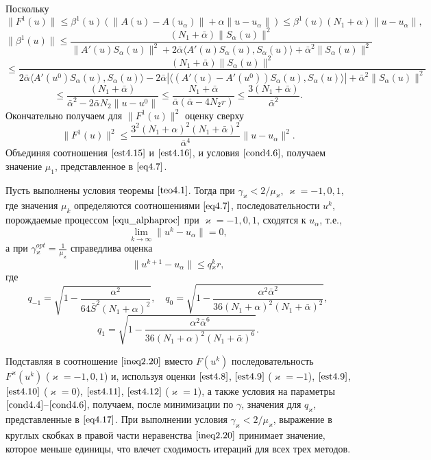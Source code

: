 Поскольку
$$\|F^1(u)\|\le\beta^1(u)(\|A(u)-A(u_\alpha)\|+\alpha\|u-u_\alpha\|)\le \beta^1(u)(N_1+\alpha)\|u-u_\alpha\|,$$ $$\|\beta^1(u)\|\le\frac{(N_1+\bar\alpha)\|S_\alpha(u)\|^2}{\|A'(u)S_\alpha(u)\|^2+2\bar\alpha\langle A'(u)S_\alpha(u), S_\alpha(u)\rangle+\bar\alpha^2\|S_\alpha(u)\|^2}$$ $$\le\frac{(N_1+\bar\alpha)\|S_\alpha(u)\|^2}{2\bar\alpha\langle A'(u^0)S_\alpha(u), S_\alpha(u)\rangle-2\bar\alpha|\langle (A'(u)-A'(u^0))S_\alpha(u), S_\alpha(u)\rangle|+\bar\alpha^2\|S_\alpha(u)\|^2}$$$$
\le\frac{(N_1+\bar\alpha)}{\bar\alpha^2-2\bar\alpha N_2\|u-u^0\|}\le\frac{N_1+\bar\alpha}{\bar\alpha(\bar\alpha - 4N_2 r)}\le\frac{3(N_1+\bar\alpha)}{\bar\alpha^2}.$$
Окончательно получаем для $\|F^1(u)\|^2$ оценку сверху
\begin{equation}\label{est4.16}
\|F^1(u)\|^2\le\frac{3^2(N_1+\alpha)^2(N_1+\bar\alpha)^2}{\bar\alpha^4}\|u-u_\alpha\|^2.
\end{equation}
Объединяя соотношения $\eqref{est4.15}$ и $\eqref{est4.16}$, и условия $\eqref{cond4.6}$, получаем значение $\mu_1$, представленное в $\eqref{eq4.7}$.
\begin{theorem}\label{teo4.3}
	Пусть выполнены условия теоремы $\ref{teo4.1}$. Тогда при $\gamma_\varkappa<2/\mu _\varkappa$, $\varkappa=-1,0,1$, где значения $\mu _k$ определяются соотношениями $\eqref{eq4.7}$, последовательности ${u^k}$, порождаемые процессом $\eqref{equ_alphaproc}$ при $\varkappa=-1,0,1$, сходятся к $u_\alpha$, т.е., $$\lim_{k\to\infty}\|u^k-u_\alpha\|=0,$$ а при $
	\gamma{_\varkappa^{opt}}=\frac{1}{\mu_\varkappa}$
	справедлива оценка $$\|u^{k+1}-u_\alpha\|\le q{_\varkappa^k}r,$$ где
	$$
	q_{-1}=\sqrt{1-\frac{\alpha^2}{64\bar S^2(N_1+\alpha)^2}}, \quad q_0=\sqrt{1-\frac{\alpha^2\bar\alpha^2}{36(N_1+\alpha)^2(N_1+\bar\alpha)^2}},$$
	\begin{equation}\label{eq4.17}
	q_1=\sqrt{1-\frac{\alpha^2\bar\alpha^6}{36(N_1+\alpha)^2(N_1+\bar\alpha)^6}}.
	\end{equation}
\end{theorem}
\proof Подставляя в соотношение $\eqref{ineq2.20}$ вместо $F(u^k)$ последовательность $F^\varkappa(u^k)$ ($\varkappa=-1,0,1$) и, используя оценки $\eqref{est4.8}$, $\eqref{est4.9}$ ($\varkappa=-1$), $\eqref{est4.9}$, $\eqref{est4.10}$ ($\varkappa=0$), $\eqref{est4.11}$, $\eqref{est4.12}$ ($\varkappa=1$), а также условия на параметры $\eqref{cond4.4}$--$\eqref{cond4.6}$, получаем, после минимизации по $\gamma$, значения для $q_\varkappa$, представленные в $\eqref{eq4.17}$. При выполнении условия $\gamma_\varkappa<2/\mu_\varkappa$, выражение в круглых скобках в правой части неравенства $\eqref{ineq2.20}$ принимает значение, которое меньше единицы, что влечет сходимость итераций для всех трех методов.

